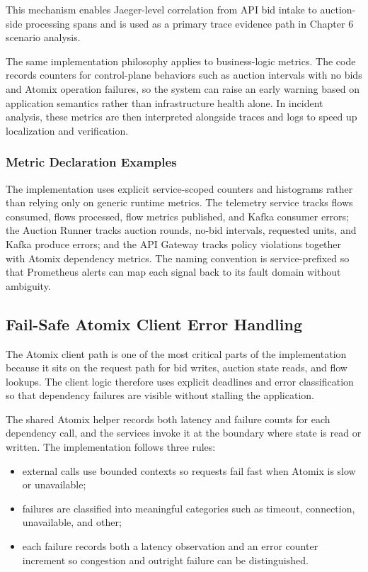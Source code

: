 This mechanism enables Jaeger-level correlation from API bid intake to auction-side processing spans and is used as a primary trace evidence path in Chapter 6 scenario analysis.

The same implementation philosophy applies to business-logic metrics. The code records counters for control-plane behaviors such as auction intervals with no bids and Atomix operation failures, so the system can raise an early warning based on application semantics rather than infrastructure health alone. In incident analysis, these metrics are then interpreted alongside traces and logs to speed up localization and verification.

\subsubsection{Metric Declaration Examples}

The implementation uses explicit service-scoped counters and histograms rather than relying only on generic runtime metrics. The telemetry service tracks flows consumed, flows processed, flow metrics published, and Kafka consumer errors; the Auction Runner tracks auction rounds, no-bid intervals, requested units, and Kafka produce errors; and the API Gateway tracks policy violations together with Atomix dependency metrics. The naming convention is service-prefixed so that Prometheus alerts can map each signal back to its fault domain without ambiguity.

\subsection{Fail-Safe Atomix Client Error Handling}

The Atomix client path is one of the most critical parts of the implementation because it sits on the request path for bid writes, auction state reads, and flow lookups. The client logic therefore uses explicit deadlines and error classification so that dependency failures are visible without stalling the application.

The shared Atomix helper records both latency and failure counts for each dependency call, and the services invoke it at the boundary where state is read or written. The implementation follows three rules:

\begin{itemize}
    \item external calls use bounded contexts so requests fail fast when Atomix is slow or unavailable;
    \item failures are classified into meaningful categories such as timeout, connection, unavailable, and other;
    \item each failure records both a latency observation and an error counter increment so congestion and outright failure can be distinguished.
\end{itemize}

